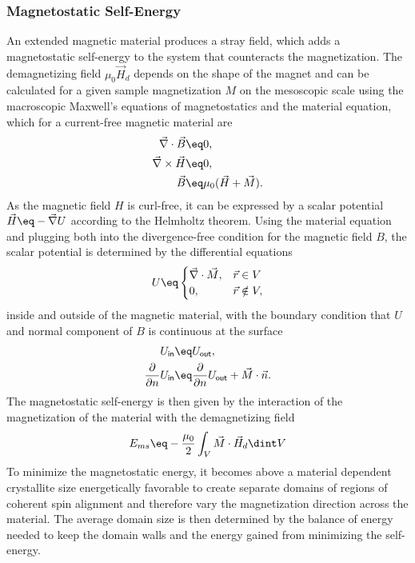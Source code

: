 \documentclass[\main/dresen_thesis.tex]{subfiles}
\begin{document}
    \subsubsection{Magnetostatic Self-Energy}
      An extended magnetic material produces a stray field, which adds a magnetostatic self-energy to the system that counteracts the magnetization.
      The demagnetizing field $\mu_0 \vec{H}_d$ depends on the shape of the magnet and can be calculated for a given sample magnetization $M$ on the mesoscopic scale using the macroscopic Maxwell's equations of magnetostatics and the material equation, which for a current-free magnetic material are \cite{Jackson_1999_Class}
      \begin{align}
        \vec{\nabla} \cdot \vec{B} \eq& 0,\\
        \vec{\nabla} \times \vec{H} \eq& 0,\\
        \vec{B} \eq& \mu_0 (\vec{H} + \vec{M}).
      \end{align}
      As the magnetic field $H$ is curl-free, it can be expressed by a scalar potential $\vec{H} \eq -\vec{\nabla} U$ according to the Helmholtz theorem.
      Using the material equation and plugging both into the divergence-free condition for the magnetic field $B$, the scalar potential is determined by the differential equations
      \begin{align}
        U \eq \begin{cases}
          \vec{\nabla} \cdot \vec{M}, & \vec{r} \in V \\
          0, &\vec{r} \notin V,
      \end{cases}
      \end{align}
      inside and outside of the magnetic material, with the boundary condition that $U$ and normal component of $B$ is continuous at the surface
      \begin{align}
        U_\mathsf{in} &\eq U_\mathsf{out},\\
        \frac{\partial}{\partial n} U_\mathsf{in} &\eq \frac{\partial}{\partial n} U_\mathsf{out} + \vec{M} \cdot \vec{n}.\\
      \end{align}
      The magnetostatic self-energy is then given by the interaction of the magnetization of the material with the demagnetizing field
      \begin{align}
        E_{ms} \eq -\frac{\mu_0}{2} \int_V \vec{M} \cdot \vec{H}_d \dint V
      \end{align}
      To minimize the magnetostatic energy, it becomes above a material dependent crystallite size energetically favorable to create separate domains of regions of coherent spin alignment and therefore vary the magnetization direction across the material.
      The average domain size is then determined by the balance of energy needed to keep the domain walls and the energy gained from minimizing the self-energy.
\end{document}
